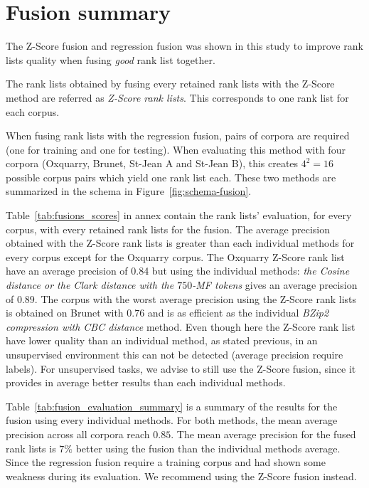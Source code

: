 \section{Fusion summary}

The Z-Score fusion and regression fusion was shown in this study to improve rank lists quality when fusing \textit{good} rank list together.

The rank lists obtained by fusing every retained rank lists with the Z-Score method are referred as \textit{Z-Score rank lists}.
This corresponds to one rank list for each corpus.

When fusing rank lists with the regression fusion, pairs of corpora are required (one for training and one for testing).
When evaluating this method with four corpora (Oxquarry, Brunet, St-Jean A and St-Jean B), this creates $4^2 = 16$ possible corpus pairs which yield one rank list each.
These two methods are summarized in the schema in Figure~\ref{fig:schema-fusion}.

Table~\ref{tab:fusions_scores} in annex contain the rank lists' evaluation, for every corpus, with every retained rank lists for the fusion.
The average precision obtained with the Z-Score rank lists is greater than each individual methods for every corpus except for the Oxquarry corpus.
The Oxquarry Z-Score rank list have an average precision of 0.84 but using the individual methods: \textit{the Cosine distance or the Clark distance with the $750$-MF tokens} gives an average precision of $0.89$.
The corpus with the worst average precision using the Z-Score rank lists is obtained on Brunet with $0.76$ and is as efficient as the individual \textit{BZip2 compression with CBC distance} method.
Even though here the Z-Score rank list have lower quality than an individual method, as stated previous, in an unsupervised environment this can not be detected (average precision require labels).
For unsupervised tasks, we advise to still use the Z-Score fusion, since it provides in average better results than each individual methods.

Table~\ref{tab:fusion_evaluation_summary} is a summary of the results for the fusion using every individual methods.
For both methods, the mean average precision across all corpora reach $0.85$.
The mean average precision for the fused rank lists is $7\%$ better using the fusion than the individual methods average.
Since the regression fusion require a training corpus and had shown some weakness during its evaluation.
We recommend using the Z-Score fusion instead.


